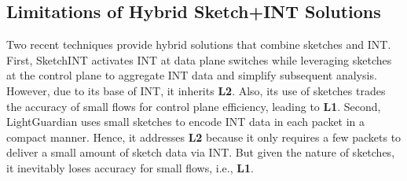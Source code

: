 \subsection{Limitations of Hybrid Sketch+INT Solutions}\label{hybrid}

Two recent techniques provide hybrid solutions that combine sketches and INT. First, SketchINT \cite{yang2023sketchint} activates INT at data plane switches while leveraging sketches at the control plane to aggregate INT data and simplify subsequent analysis. However, due to its base of INT, it inherits \textbf{L2}. Also, its use of sketches trades the accuracy of small flows for control plane efficiency, leading to \textbf{L1}. Second, LightGuardian \cite{zhao2021lightguardian} uses small sketches to encode INT data in each packet in a compact manner. Hence, it addresses \textbf{L2} because it only requires a few packets to deliver a small amount of sketch data via INT. But given the nature of sketches, it inevitably loses accuracy for small flows, i.e., \textbf{L1}. 







